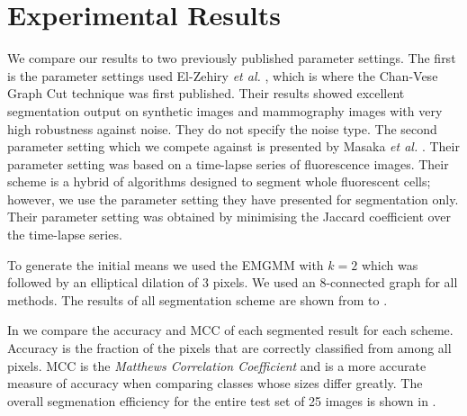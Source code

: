 \documentclass[10pt, journal, letterpaper, onecolumn, draftcls]{IEEEtran}
\begin{document}
\section{Experimental Results}
\label{sec:Expresults}
We compare our results to two previously published parameter settings.
The first is the parameter settings used El-Zehiry \textit{et al.} \cite{ElZehiry2007}, which is where the Chan-Vese Graph Cut technique was first published.
Their results showed excellent segmentation output on synthetic images and mammography images with very high robustness against noise. They do not specify the noise type.
The second parameter setting which we compete against is presented by Masaka \textit{et al.} \cite{Maska2013}.
Their parameter setting was based on a time-lapse series of fluorescence images. Their scheme is a hybrid of algorithms designed to segment whole fluorescent cells; however, we use the parameter setting they have presented for segmentation only. Their parameter setting was obtained by minimising the Jaccard coefficient over the time-lapse series.

To generate the initial means we used the EMGMM with $k=2$ which was followed by an elliptical dilation of $3$ pixels. We used an 8-connected graph for all methods.
The results of all segmentation scheme are shown from  to .

In  we compare the accuracy and MCC of each segmented result for each scheme. Accuracy is the fraction of the pixels that are correctly classified from among all pixels. MCC is the \textit{Matthews Correlation Coefficient} and is a more accurate measure of accuracy when comparing classes whose sizes differ greatly. 
The overall segmenation efficiency for the entire test set of 25 images is shown in .
\end{document}

